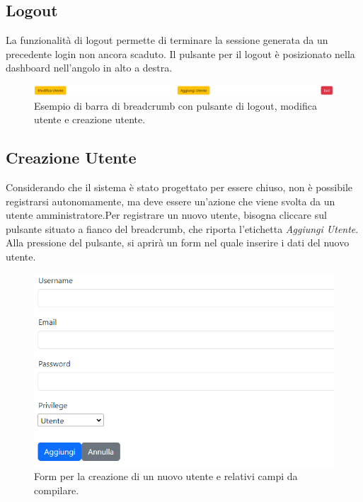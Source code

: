 \documentclass[a4paper, 12pt]{article}
\begin{document}
\subsection{Logout}
La funzionalità di logout permette di terminare la sessione generata da un precedente login non ancora scaduto. Il pulsante per il logout è posizionato nella dashboard nell'angolo in alto a destra.
\begin{figure}[H]
\centering
\includegraphics[width=\textwidth]{EsempioBreadcrumbConEsci}
\caption{Esempio di barra di breadcrumb con pulsante di logout, modifica utente e creazione utente.}
\end{figure}

\subsection{Creazione Utente}
Considerando che il sistema è stato progettato per essere chiuso, non è possibile registrarsi autonomamente, ma deve essere un'azione che viene svolta da un utente amministratore.Per registrare un nuovo utente, bisogna cliccare sul pulsante situato a fianco del breadcrumb, che riporta l'etichetta \textit{Aggiungi Utente}.\\
Alla pressione del pulsante, si aprirà un form nel quale inserire i dati del nuovo utente.
\begin{figure}[H]
    \centering
    \includegraphics[width=\textwidth]{FormAggiuntaUtente}
    \caption{Form per la creazione di un nuovo utente e relativi campi da compilare.}
\end{figure}
\end{document}
